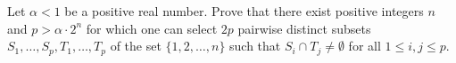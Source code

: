 Let $\alpha < 1$ be a positive real number. Prove that there exist positive integers $n$ and $p > \alpha \cdot 2^{n}$ for which one can select $2p$ pairwise distinct subsets $S_1, \ldots, S_p, T_1, \ldots, T_p$ of the set $\{1, 2, \ldots, n\}$ such that $S_i \cap T_j \neq \emptyset$ for all $1 \leq i, j \leq p$.
